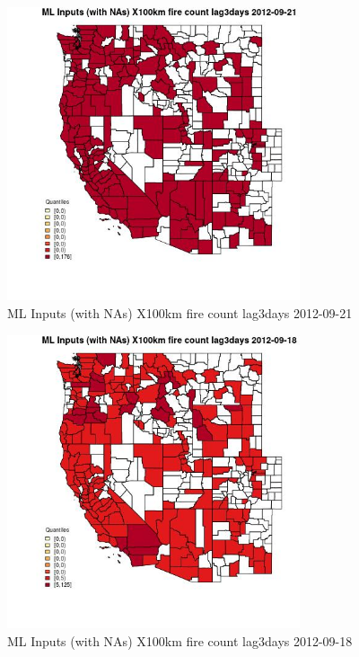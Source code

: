 \begin{figure} 
\centering  
\includegraphics[width=0.77\textwidth]{Code_Outputs/Report_ML_input_PM25_Step4_part_e_de_duplicated_aves_compiled_2019-05-14wNAs_CountyX100km_fire_count_lag3daysMean2012-09-21_2012-09-21.jpg} 
\caption{\label{fig:Report_ML_input_PM25_Step4_part_e_de_duplicated_aves_compiled_2019-05-14wNAsCountyX100km_fire_count_lag3daysMean2012-09-21_2012-09-21}ML Inputs (with NAs) X100km fire count lag3days 2012-09-21} 
\end{figure} 
 

\begin{figure} 
\centering  
\includegraphics[width=0.77\textwidth]{Code_Outputs/Report_ML_input_PM25_Step4_part_e_de_duplicated_aves_compiled_2019-05-14wNAs_CountyX100km_fire_count_lag3daysMean2012-09-18_2012-09-18.jpg} 
\caption{\label{fig:Report_ML_input_PM25_Step4_part_e_de_duplicated_aves_compiled_2019-05-14wNAsCountyX100km_fire_count_lag3daysMean2012-09-18_2012-09-18}ML Inputs (with NAs) X100km fire count lag3days 2012-09-18} 
\end{figure} 
 

